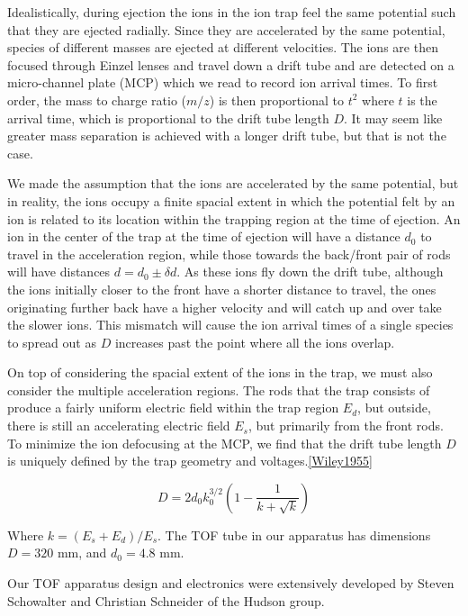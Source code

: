 Idealistically, during ejection the ions in the ion trap feel the same potential such that they are ejected radially. Since they are accelerated by the same potential, species of different masses are ejected at different velocities. The ions are then focused through Einzel lenses and travel down a drift tube and are detected on a micro-channel plate (MCP) which we read to record ion arrival times. To first order, the mass to charge ratio ($m/z$) is then proportional to $t^2$ where $t$ is the arrival time, which is proportional to the drift tube length $D$. It may seem like greater mass separation is achieved with a longer drift tube, but that is not the case.

We made the assumption that the ions are accelerated by the same potential, but in reality, the ions occupy a finite spacial extent in which the potential felt by an ion is related to its location within the trapping region at the time of ejection. An ion in the center of the trap at the time of ejection will have a distance $d_0$ to travel in the acceleration region, while those towards the back/front pair of rods will have distances $d=d_0\pm \delta d$. As these ions fly down the drift tube, although the ions initially closer to the front have a shorter distance to travel, the ones originating further back have a higher velocity and will catch up and over take the slower ions. This mismatch will cause the ion arrival times of a single species to spread out as $D$ increases past the point where all the ions overlap.

On top of considering the spacial extent of the ions in the trap, we must also consider the multiple acceleration regions. The rods that the trap consists of produce a fairly uniform electric field within the trap region $E_d$, but outside, there is still an accelerating electric field $E_s$, but primarily from the front rods. To minimize the ion defocusing at the MCP, we find that the drift tube length $D$ is uniquely defined by the trap geometry and voltages.\ref{Wiley1955}

\begin{equation}
	D = 2d_0 k_0^{3/2}\left(1-\frac{1}{k+\sqrt{k}}\right)
\end{equation}

Where $k = (E_s + E_d)/E_s$. The TOF tube in our apparatus has dimensions $D=320$ mm, and $d_0=4.8$ mm.

Our TOF apparatus design and electronics were extensively developed by Steven Schowalter and Christian Schneider of the Hudson group.\cite{Schowalter2012,Schneider2014}

